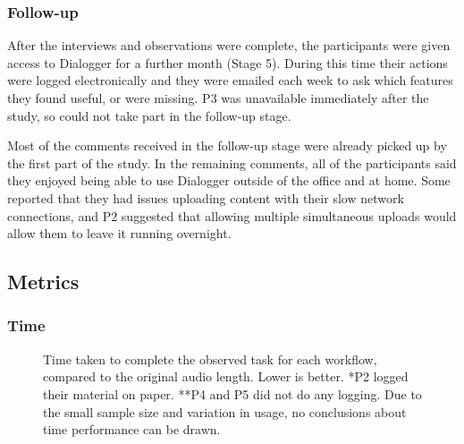 

\subsubsection{Follow-up}\label{sec:followup}

After the interviews and observations were complete, the participants were given access to Dialogger for a further
month (Stage 5). During this time their actions were logged electronically and they were emailed each week to ask which
features they found useful, or were missing. P3 was unavailable immediately after the study, so could not take part in
the follow-up stage.

Most of the comments received in the follow-up stage were already picked up by the first part of the study. In the
remaining comments, all of the participants said they enjoyed being able to use Dialogger outside of the office and at
home. Some reported that they had issues uploading content with their slow network connections, and P2 suggested that
allowing multiple simultaneous uploads would allow them to leave it running overnight.


\subsection{Metrics}\label{sec:resultsmetrics}
\subsubsection{Time}

\begin{figure}
\centering
  \caption{Time taken to complete the observed task for each workflow, compared to the original audio length. Lower is
    better. *P2 logged their material on paper. **P4 and P5 did not do any logging. Due to the small sample size and
    variation in usage, no conclusions about time performance can be drawn.}
  \label{fig:time} \end{figure}

